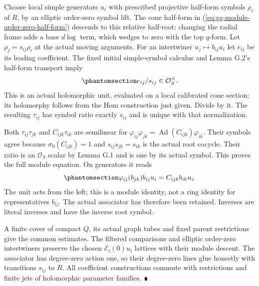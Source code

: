 \documentclass[
  english,
  11pt,
  reqno]{amsart}
\begin{document}
Choose local simple generators \(u_i\) with prescribed projective
half-form symbols \(\rho_i\) of \(R\), by an elliptic order-zero symbol
lift. The cone half-form in (\ref{eq:gg-module-order-zero-half-form})
descends to this relative half-root: changing the radial frame adds a
base \(d\log\) term, which wedges to zero with the top \(q\)-form. Let
\(\rho_j=s_{ij}\rho_i\) at the actual moving arguments. For an
intertwiner \(u_j\mapsto b_{ij}u_i\) let \(e_{ij}\) be its leading
coefficient. The fixed initial simple-symbol calculus and Lemma G.2's
half-form transport imply
\begin{equation}\protect\phantomsection\label{eq:gg-module-symbol-normalization}{
 e_{ij}/s_{ij}\in\mathcal O_S^\times .
}\end{equation} This is an actual holomorphic unit, evaluated on a local
calibrated cone section; its holomorphy follows from the Hom
construction just given. Divide by it. The resulting \(\tau_{ij}\) has
symbol ratio exactly \(s_{ij}\) and is unique with that normalization.

Both \(\tau_{ij}\tau_{jk}\) and \(C_{ijk}\tau_{ik}\) are semilinear for
\(\varphi_{ij}\varphi_{jk}=\operatorname{Ad}(C_{ijk})\varphi_{ik}\).
Their symbols agree because \(\sigma_0(C_{ijk})=1\) and
\(s_{ij}s_{jk}=s_{ik}\) is the actual root cocycle. Their ratio is an
\(\mathcal O_S\) scalar by Lemma G.1 and is one by its actual symbol.
This proves the full module equation. On generators it reads
\begin{equation}\protect\phantomsection\label{eq:gg-module-generator-triple}{
 \varphi_{ij}(b_{jk})b_{ij}u_i=C_{ijk}b_{ik}u_i .
}\end{equation} The unit acts from the left; this is a module identity,
not a ring identity for representatives \(b_{ij}\). The actual
associator has therefore been retained. Inverses are literal inverses
and have the inverse root symbol.

A finite cover of compact \(Q\), its actual graph tubes and fixed parent
restrictions give the common estimates. The filtered comparisons and
elliptic order-zero intertwiners preserve the chosen
\(\mathcal E_i(0)u_i\) lattices with their module descent. The
associator has degree-zero action one, so their degree-zero lines glue
honestly with transitions \(s_{ij}\) to \(R\). All coefficient
constructions commute with restrictions and finite jets of holomorphic
parameter families. ∎

\protect{}\label{sec:gg-module-relative-framing}
\end{document}
